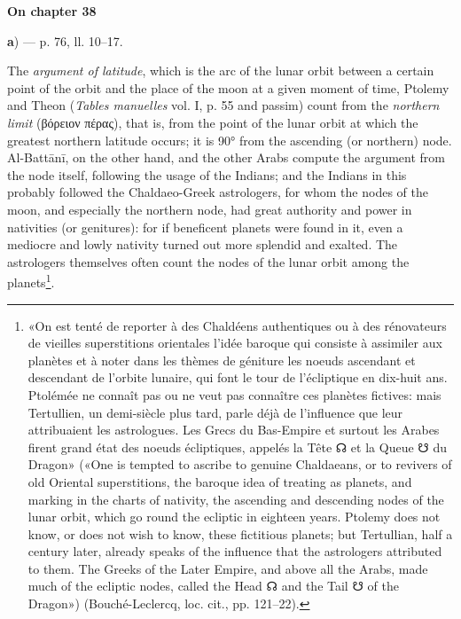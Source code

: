 \documentclass[11pt]{article}
\newcommand{\Pg}[1]{\marginpar{\footnotesize\color{gray}#1}}
\newcommand{\UnitHead}[2]{\par\setcounter{footnoteT}{0}\needspace{8\baselineskip}\bigskip\pdfbookmark[1]{#1}{unit-#2}\hypertarget{EN-#2}{}%
 {\large\bfseries\interlinepenalty=10000 #1\par}\nobreak\medskip}
\begin{document}
\UnitHead{On chapter 38}{A38}
\par\begin{center}\textbf{a}) — p. 76, ll. 10–17.\end{center}
\par \Pg{I 251}The \emph{argument of latitude}, which is the arc of the lunar orbit between a certain point of the orbit and the place of the moon at a given moment of time, Ptolemy and Theon (\emph{Tables manuelles} vol. I, p. 55 and passim) count from the \emph{northern limit} ({\greekfont βόρειον πέρας}), that is, from the point of the lunar orbit at which the greatest northern latitude occurs; it is 90° from the ascending (or northern) node. Al-Battānī, on the other hand, and the other Arabs compute the argument from the node itself, following the usage of the Indians; and the Indians in this probably followed the Chaldaeo-Greek astrologers, for whom the nodes of the moon, and especially the northern node, had great authority and power in nativities (or genitures): for if beneficent planets were found in it, even a mediocre and lowly nativity turned out more splendid and exalted. The astrologers themselves often count the nodes of the lunar orbit among the planets\footnote{«On est tenté de reporter à des Chaldéens authentiques ou à des rénovateurs de vieilles superstitions orientales l’idée baroque qui consiste à assimiler aux planètes et à noter dans les thèmes de géniture les noeuds ascendant et descendant de l’orbite lunaire, qui font le tour de l’écliptique en dix-huit ans. Ptolémée ne connaît pas ou ne veut pas connaître ces planètes fictives: mais Tertullien, un demi-siècle plus tard, parle déjà de l’influence que leur attribuaient les astrologues. Les Grecs du Bas-Empire et surtout les Arabes firent grand état des noeuds écliptiques, appelés la Tête {\MoonFont\upshape ☊} et la Queue {\MoonFont\upshape ☋} du Dragon» («One is tempted to ascribe to genuine Chaldaeans, or to revivers of old Oriental superstitions, the baroque idea of treating as planets, and marking in the charts of nativity, the ascending and descending nodes of the lunar orbit, which go round the ecliptic in eighteen years. Ptolemy does not know, or does not wish to know, these fictitious planets; but Tertullian, half a century later, already speaks of the influence that the astrologers attributed to them. The Greeks of the Later Empire, and above all the Arabs, made much of the ecliptic nodes, called the Head {\MoonFont\upshape ☊} and the Tail {\MoonFont\upshape ☋} of the Dragon») (Bouché-Leclercq, loc. cit., pp. 121–22).}.\par
\end{document}
